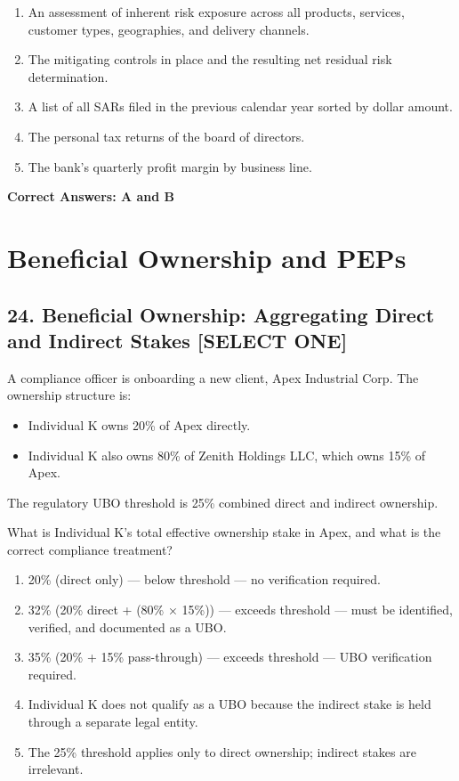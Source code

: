 \documentclass[11pt,a4paper]{article}
\begin{document}
	\begin{enumerate}[label=\Alph*.]
		\item An assessment of inherent risk exposure across all products, services, customer types, geographies, and delivery channels.
		\item The mitigating controls in place and the resulting net residual risk determination.
		\item A list of all SARs filed in the previous calendar year sorted by dollar amount.
		\item The personal tax returns of the board of directors.
		\item The bank's quarterly profit margin by business line.
	\end{enumerate}
	
	\textbf{Correct Answers: A and B}
	
	\section{Beneficial Ownership and PEPs}
	
	\subsection{24. Beneficial Ownership: Aggregating Direct and Indirect Stakes \textnormal{[SELECT ONE]}}
	
	A compliance officer is onboarding a new client, Apex Industrial Corp. The ownership structure is:
	\begin{itemize}
		\item Individual K owns 20\% of Apex directly.
		\item Individual K also owns 80\% of Zenith Holdings LLC, which owns 15\% of Apex.
	\end{itemize}
	The regulatory UBO threshold is 25\% combined direct and indirect ownership.
	
	What is Individual K's total effective ownership stake in Apex, and what is the correct compliance treatment?
	
	\begin{enumerate}[label=\Alph*.]
		\item 20\% (direct only) — below threshold — no verification required.
		\item 32\% (20\% direct + (80\% × 15\%)) — exceeds threshold — must be identified, verified, and documented as a UBO.
		\item 35\% (20\% + 15\% pass-through) — exceeds threshold — UBO verification required.
		\item Individual K does not qualify as a UBO because the indirect stake is held through a separate legal entity.
		\item The 25\% threshold applies only to direct ownership; indirect stakes are irrelevant.
	\end{enumerate}
	
\end{document}
